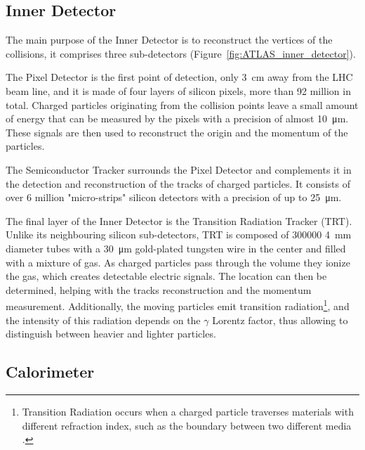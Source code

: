 \subsection{Inner Detector}\label{sec:ATLAS_inner_detector}
\marginpar{\flushleft }
The main purpose of the Inner Detector is to reconstruct the vertices of the collisions, it comprises three sub-detectors (Figure~\ref{fig:ATLAS_inner_detector}).

The Pixel Detector is the first point of detection, only \qty{3}{\centi\meter} away from the LHC beam line, and it is made of four layers of silicon pixels, more than 92 million in total. Charged particles originating from the collision points leave a small amount of energy that can be measured by the pixels with a precision of almost \qty{10}{\micro\meter}. These signals are then used to reconstruct the origin and the momentum of the particles.

The Semiconductor Tracker surrounds the Pixel Detector and complements it in the detection and reconstruction of the tracks of charged particles. It consists of over 6 million "micro-strips" silicon detectors with a precision of up to \qty{25}{\micro\meter}.

The final layer of the Inner Detector is the Transition Radiation Tracker (TRT). Unlike its neighbouring silicon sub-detectors, TRT is composed of \num{300000} \qty{4}{\milli\meter} diameter tubes with a \qty{30}{\micro\meter} gold-plated tungsten wire in the center and filled with a mixture of gas. As charged particles pass through the volume they ionize the gas, which creates detectable electric signals. The location can then be determined, helping with the tracks reconstruction and the momentum measurement. Additionally, the moving particles emit transition radiation\footnote{Transition Radiation occurs when a charged particle traverses materials with different refraction index, such as the boundary between two different media \cite{wikipediaTransitionRadiation}.}, and the intensity of this radiation depends on the \(\gamma\) Lorentz factor, thus allowing to distinguish between heavier and lighter particles.


\subsection{Calorimeter}\label{sec:ATLAS_calorimeter}


